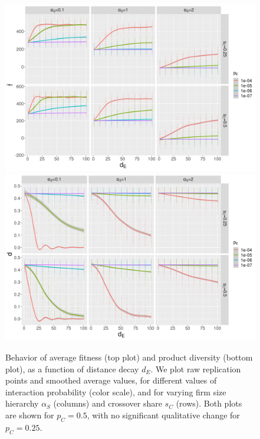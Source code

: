 \documentclass[letterpaper]{article}
\begin{document}
\begin{figure}
\begin{center}
\includegraphics[width=0.9\linewidth]{figures/averageFitness-distanceDecay_color-interactionProba_facet-crossOverShare-firmSizeScaling_crossOverProba0.5.png}\\
\includegraphics[width=0.9\linewidth]{figures/diversity-distanceDecay_color-interactionProba_facet-crossOverShare-firmSizeScaling_crossOverProba0.5.png}\\
\caption{Behavior of average fitness (top plot) and product diversity (bottom plot), as a function of distance decay $d_E$. We plot raw replication points and smoothed average values, for different values of interaction probability (color scale), and for varying firm size hierarchy $\alpha_S$ (columns) and crossover share $s_C$ (rows). Both plots are shown for $p_C = 0.5$, with no significant qualitative change for $p_C = 0.25$.}
\label{fig:fig1}
\end{center}
\end{figure}
\end{document}
